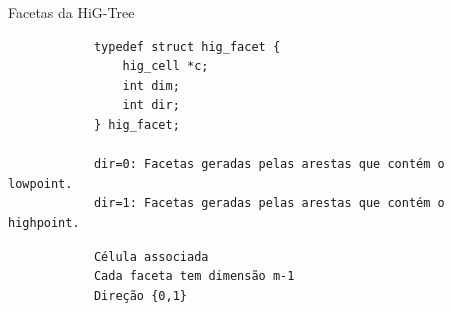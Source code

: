 \documentclass[../main/main.tex]{subfiles}
\begin{document}
\begin{frame}[fragile]{\smaller \smaller Facetas da HiG-Tree}
	\vspace{-0.5cm}
	\begin{minipage}{0.35\textwidth}
		\begin{verbatim}
			typedef struct hig_facet {
				hig_cell *c;
				int dim;
				int dir;
			} hig_facet;
			
			dir=0: Facetas geradas pelas arestas que contém o lowpoint.
			dir=1: Facetas geradas pelas arestas que contém o highpoint.
		\end{verbatim}
	\end{minipage}
	\hfill
	\begin{minipage}{0.55\textwidth}
		\vspace{-1.3cm}
		\begin{verbatim}
			Célula associada
			Cada faceta tem dimensão m-1
			Direção {0,1}
		\end{verbatim}
	\end{minipage}
	
	\vspace{-0.25cm}
	\begin{center}
	\end{center}
\end{frame}
\end{document}
